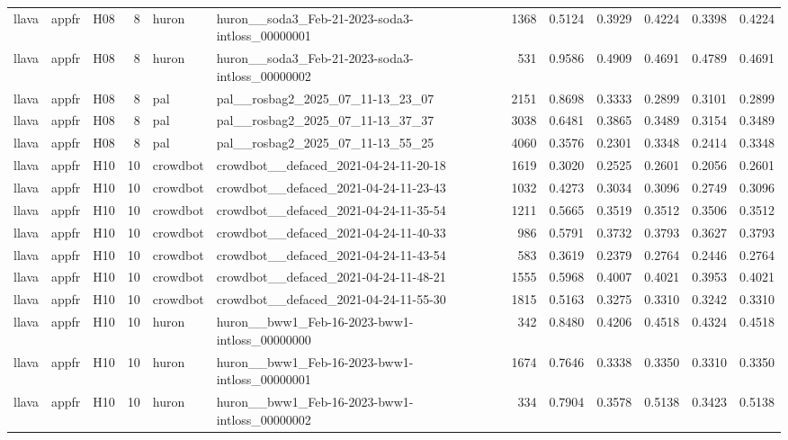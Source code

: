 \begin{table}[tbp]
\begin{tabular}{lllrllrrrrrr}
llava & appfr & H08 & 8 & huron & huron\_\_soda3\_Feb-21-2023-soda3-intloss\_00000001 & 1368 & 0.5124 & 0.3929 & 0.4224 & 0.3398 & 0.4224 \\
llava & appfr & H08 & 8 & huron & huron\_\_soda3\_Feb-21-2023-soda3-intloss\_00000002 & 531 & 0.9586 & 0.4909 & 0.4691 & 0.4789 & 0.4691 \\
llava & appfr & H08 & 8 & pal & pal\_\_rosbag2\_2025\_07\_11-13\_23\_07 & 2151 & 0.8698 & 0.3333 & 0.2899 & 0.3101 & 0.2899 \\
llava & appfr & H08 & 8 & pal & pal\_\_rosbag2\_2025\_07\_11-13\_37\_37 & 3038 & 0.6481 & 0.3865 & 0.3489 & 0.3154 & 0.3489 \\
llava & appfr & H08 & 8 & pal & pal\_\_rosbag2\_2025\_07\_11-13\_55\_25 & 4060 & 0.3576 & 0.2301 & 0.3348 & 0.2414 & 0.3348 \\
llava & appfr & H10 & 10 & crowdbot & crowdbot\_\_defaced\_2021-04-24-11-20-18 & 1619 & 0.3020 & 0.2525 & 0.2601 & 0.2056 & 0.2601 \\
llava & appfr & H10 & 10 & crowdbot & crowdbot\_\_defaced\_2021-04-24-11-23-43 & 1032 & 0.4273 & 0.3034 & 0.3096 & 0.2749 & 0.3096 \\
llava & appfr & H10 & 10 & crowdbot & crowdbot\_\_defaced\_2021-04-24-11-35-54 & 1211 & 0.5665 & 0.3519 & 0.3512 & 0.3506 & 0.3512 \\
llava & appfr & H10 & 10 & crowdbot & crowdbot\_\_defaced\_2021-04-24-11-40-33 & 986 & 0.5791 & 0.3732 & 0.3793 & 0.3627 & 0.3793 \\
llava & appfr & H10 & 10 & crowdbot & crowdbot\_\_defaced\_2021-04-24-11-43-54 & 583 & 0.3619 & 0.2379 & 0.2764 & 0.2446 & 0.2764 \\
llava & appfr & H10 & 10 & crowdbot & crowdbot\_\_defaced\_2021-04-24-11-48-21 & 1555 & 0.5968 & 0.4007 & 0.4021 & 0.3953 & 0.4021 \\
llava & appfr & H10 & 10 & crowdbot & crowdbot\_\_defaced\_2021-04-24-11-55-30 & 1815 & 0.5163 & 0.3275 & 0.3310 & 0.3242 & 0.3310 \\
llava & appfr & H10 & 10 & huron & huron\_\_bww1\_Feb-16-2023-bww1-intloss\_00000000 & 342 & 0.8480 & 0.4206 & 0.4518 & 0.4324 & 0.4518 \\
llava & appfr & H10 & 10 & huron & huron\_\_bww1\_Feb-16-2023-bww1-intloss\_00000001 & 1674 & 0.7646 & 0.3338 & 0.3350 & 0.3310 & 0.3350 \\
llava & appfr & H10 & 10 & huron & huron\_\_bww1\_Feb-16-2023-bww1-intloss\_00000002 & 334 & 0.7904 & 0.3578 & 0.5138 & 0.3423 & 0.5138 \\

\end{tabular}
\end{table}
